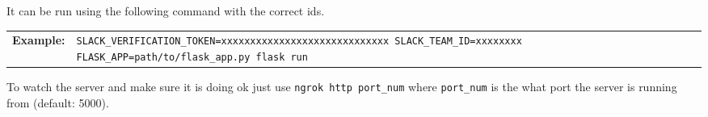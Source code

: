 \documentclass{article}
\newcommand{\example}[1]{
\begin{tabular}{ l p{\textwidth} }
	\textbf{Example:} & \texttt{#1}
\end{tabular}
}
\newcommand{\un}[0]{\_}
\begin{document}
It can be run using the following command with the correct ids.

\example{SLACK\un VERIFICATION\un TOKEN=xxxxxxxxxxxxxxxxxxxxxxxxxxxxx SLACK\un TEAM\un ID=xxxxxxxx FLASK\un APP=path/to/flask\un app.py flask run}

To watch the server and make sure it is doing ok just use \texttt{ngrok http port\un num} where \texttt{port\un num} is the what port the server is running from (default: 5000).
\end{document}
